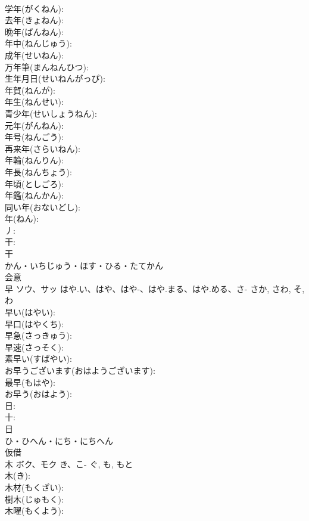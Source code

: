 \documentclass[8pt]{extreport}
\begin{document}
\begin{CJK}{UTF8}{min}
\\	学年(がくねん): 
\\	去年(きょねん): 
\\	晩年(ばんねん): 
\\	年中(ねんじゅう): 
\\	成年(せいねん): 
\\	万年筆(まんねんひつ): 
\\	生年月日(せいねんがっぴ): 
\\	年賀(ねんが): 
\\	年生(ねんせい): 
\\	青少年(せいしょうねん): 
\\	元年(がんねん): 
\\	年号(ねんごう): 
\\	再来年(さらいねん): 
\\	年輪(ねんりん): 
\\	年長(ねんちょう): 
\\	年頃(としごろ): 
\\	年鑑(ねんかん): 
\\	同い年(おないどし): 
\\	年(ねん): 
\\	丿: 
\\	干: 
\\	干	
\\	かん・いちじゅう・ほす・ひる・たてかん	
\\	会意 
\\	早	ソウ、サッ	はや.い、はや、はや-、はや.まる、はや.める、さ-	さか, さわ, そ, わ	
\\	早い(はやい): 
\\	早口(はやくち): 
\\	早急(さっきゅう): 
\\	早速(さっそく): 
\\	素早い(すばやい): 
\\	お早うございます(おはようございます): 
\\	最早(もはや): 
\\	お早う(おはよう): 
\\	日: 
\\	十: 
\\	日	
\\	ひ・ひへん・にち・にちへん	
\\	仮借 
\\	木	ボク、モク	き、こ-	ぐ, も, もと	
\\	木(き): 
\\	木材(もくざい): 
\\	樹木(じゅもく): 
\\	木曜(もくよう): 

\end{CJK}
\end{document}
